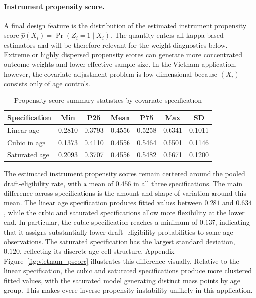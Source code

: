 \documentclass[12pt, a4paper, oneside]{article}
\theoremstyle{plain}
\theoremstyle{definition}
\begin{document}
\paragraph{Instrument propensity score.}
A final design feature is the distribution of the estimated instrument propensity score $\hat{p}(X_i) = \Pr(Z_i = 1 \mid X_i)$.
The quantity enters all kappa-based estimators and will be therefore relevant for the weight diagnostics below. Extreme or highly dispersed propensity scores can generate more concentrated outcome weights and lower effective sample size. In the Vietnam application, however, the covariate adjustment problem is low-dimensional because $(X_i)$ consists only of age controls.
\begin{table}[htbp]
\centering
\caption{Propensity score summary statistics by covariate specification}
\label{tab:vietnam_pscore_stats}
\begin{threeparttable}
\renewcommand{\arraystretch}{1.2}
\begin{tabular}{@{}lcccccc@{}}
\toprule
Specification & Min & P25 & Mean & P75 & Max & SD \\
\midrule
Linear age    & 0.2810 & 0.3793 & 0.4556 & 0.5258 & 0.6341 & 0.1011 \\
Cubic in age  & 0.1373 & 0.4110 & 0.4556 & 0.5464 & 0.5501 & 0.1146 \\
Saturated age & 0.2093 & 0.3707 & 0.4556 & 0.5482 & 0.5671 & 0.1200 \\
\bottomrule
\end{tabular}
\end{threeparttable}
\end{table}
The estimated instrument
propensity scores remain centered around the pooled draft-eligibility rate,
with a mean of \(0.456\) in all three specifications.
The main difference across specifications is the amount and shape of variation
around this mean. The linear age specification produces fitted values between
\(0.281\) and \(0.634\), while the cubic and saturated specifications allow more
flexibility at the lower end. In particular, the cubic specification reaches a
minimum of \(0.137\), indicating that it assigns substantially lower draft-
eligibility probabilities to some age observations. The saturated specification
has the largest standard deviation, \(0.120\), reflecting its discrete age-cell
structure.
Appendix Figure~\ref{fig:vietnam_pscore} illustrates this difference visually. Relative to the linear specification, the cubic and saturated specifications produce more clustered fitted values, with the saturated model generating distinct mass points by age group.
This makes evere inverse-propensity instability unlikely in this application.
\end{document}
